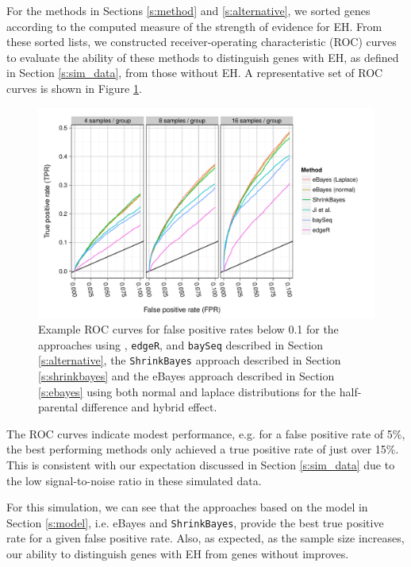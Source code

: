 \documentclass[useAMS,usenatbib,referee]{biom}
\newcommand{\edgeR}{{\tt edgeR}}
\newcommand{\baySeq}{{\tt baySeq}}
\newcommand{\ShrinkBayes}{{\tt ShrinkBayes}}
\begin{document}
For the methods in Sections \ref{s:method} and \ref{s:alternative}, we sorted genes according to the computed measure of the strength of evidence for EH. From these sorted lists, we constructed receiver-operating characteristic (ROC) curves to evaluate the ability of these methods to distinguish genes with EH, as defined in Section \ref{s:sim_data}, 
from those without EH. A representative set of ROC curves is shown in Figure \ref{f:roc}. 
\begin{figure}[htbp]
\centerline{\includegraphics[width=\textwidth]{exampleROC0_1}}
\caption{Example ROC curves for false positive rates below 0.1 for the approaches using \citeauthor{ji2014estimation}, \edgeR{}, and \baySeq{} described in Section \ref{s:alternative}, the \ShrinkBayes{} approach described in Section \ref{s:shrinkbayes} and the eBayes approach described in Section \ref{s:ebayes} using both normal and laplace distributions for the half-parental difference and hybrid effect.}
\label{f:roc}
\end{figure}
The ROC curves indicate modest performance, e.g. for a false positive rate of 5\%, the best performing methods only achieved a true positive rate of just over 15\%. This is consistent with our expectation discussed in Section \ref{s:sim_data} due to the low signal-to-noise ratio in these simulated data. 

For this simulation, we can see that the approaches based on the model in Section \ref{s:model}, i.e. eBayes and \ShrinkBayes{}, provide the best true positive rate for a given false positive rate. Also, as expected, as the sample size increases, our ability to distinguish genes with EH from genes without improves. 
\end{document}
